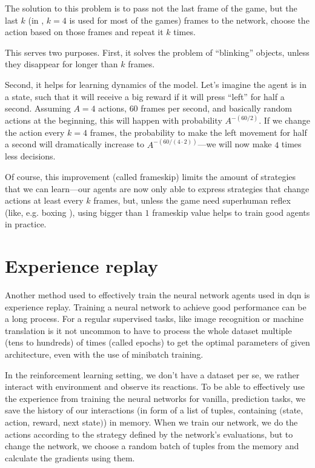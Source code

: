 The solution to this problem is to pass not the last frame of the game, but the last $k$ (in \cite{nips-dqn}, $k=4$ is used for most of the games) frames to the network, choose the action based on those frames and repeat it $k$ times.

This serves two purposes. First, it solves the problem of ``blinking'' objects, unless they disappear for longer than $k$ frames.

Second, it helps for learning dynamics of the model. Let's imagine the agent is in a state, such that it will receive a big reward if it will press ``left'' for half a second. Assuming $A=4$ actions, $60$ frames per second, and basically random actions at the beginning, this will happen with probability $A^{-(60 / 2)}$. If we change the action every $k=4$ frames, the probability to make the left movement for half a second will dramatically increase to $A^{-(60/(4 \cdot 2))}$---we will now make $4$ times less decisions.

Of course, this improvement (called frameskip) limits the amount of strategies that we can learn---our agents are now only able to express strategies that change actions at least every $k$ frames, but, unless the game need superhuman reflex (like, e.g. boxing ), using bigger than $1$ frameskip value helps to train good agents in practice.

\section{Experience replay}\label{experience-replay}
Another method used to effectively train the neural network agents used in dqn is experience replay. Training a neural network to achieve good performance can be a long process. For a regular supervised tasks, like image recognition or machine translation is it not uncommon to have to process the whole dataset multiple (tens to hundreds) of times (called epochs) to get the optimal parameters of given architecture, even with the use of minibatch training.

In the reinforcement learning setting, we don't have a dataset per se, we rather interact with environment and observe its reactions. To be able to effectively use the experience from training the neural networks for vanilla, prediction tasks, we save the history of our interactions (in form of a list of tuples, containing $($state, action, reward, next state$)$) in memory. When we train our network, we do the actions according to the strategy defined by the network's evaluations, but to change the network, we choose a random batch of tuples from the memory and calculate the gradients using them.

